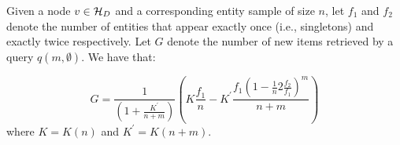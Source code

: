\vspace{-5pt}\begin{theorem}
\label{newgain}
Given a node $v \in \mathcal{H}_D$ and a corresponding entity sample of size $n$, let $f_1$ and $f_2$ denote the number of entities that appear exactly once (i.e., singletons) and exactly twice respectively. Let $G$ denote the number of new items retrieved by a query $q(m,\emptyset)$. We have that:

\vspace{-10pt}\begin{equation}
\label{eq:dirgain}
G = \frac{1}{(1 + \frac{K^{\prime}}{n+m})}(K\frac{f_1}{n} - K^{\prime}\frac{f_1(1-\frac{1}{n}2\frac{f_2}{f_1})^m}{n+m})
\end{equation}
where $K = K(n)$ and $K^{\prime} = K(n+m)$.
\end{theorem}
\iftr
